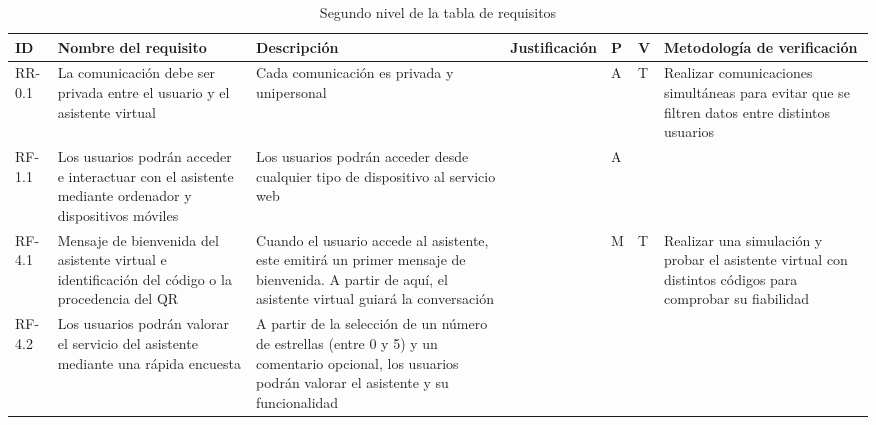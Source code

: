 \begin{table}[ht]
\begin{centering}
\begin{tabular}{|l|>{\centering}p{}|>{\centering}p{}|>{\centering}p{}|>{\centering}p{}|>{\centering}p{}|p{3cm}|}
\hline
ID & Nombre del requisito & Descripción & Justificación & P & V & Metodología de verificación \\ \hline
RR-0.1&  La comunicación debe ser privada entre el usuario y el asistente virtual & Cada comunicación es privada y unipersonal  &  & A & T & Realizar comunicaciones simultáneas para evitar que se filtren datos entre distintos usuarios \\ \hline
RF-1.1 & Los usuarios podrán acceder e interactuar con el asistente mediante ordenador y dispositivos móviles & Los usuarios podrán acceder desde cualquier tipo de dispositivo al servicio web & & A & & \\ \hline
RF-4.1&  Mensaje de bienvenida del asistente virtual e identificación del código o la procedencia del QR & Cuando el usuario accede al asistente, este emitirá un primer mensaje de bienvenida. A partir de aquí, el asistente virtual guiará la conversación  &  & M & T & Realizar una simulación y probar el asistente virtual con distintos códigos para comprobar su fiabilidad \\ \hline
RF-4.2 &  Los usuarios podrán valorar el servicio del asistente mediante una rápida encuesta & A partir de la selección de un número de estrellas (entre 0 y 5) y un comentario opcional, los usuarios podrán valorar el asistente y su funcionalidad  &   &  &  & \\ \hline
\end{tabular}
\caption{Segundo nivel de la tabla de requisitos}
\end{centering}
\end{table}







